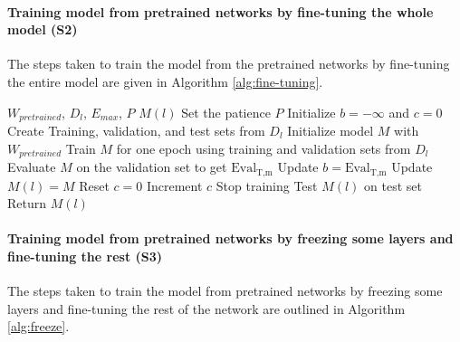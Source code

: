 \documentclass{ieeeaccess}
\begin{document}
\vspace{0.2cm}

\paragraph{Training model from pretrained networks by fine-tuning the whole model (S2)}
The steps taken to train the model from the pretrained networks by fine-tuning the entire model are given in Algorithm \ref{alg:fine-tuning}.

\begin{algorithm}[!ht]
\caption{Training model from pretrained networks by fine-tuning the whole model (S2)}
\label{alg:fine-tuning}
\begin{algorithmic}[1]
\REQUIRE $W_{pretrained}$, $D_{\textit{l}}$, $E_{max}$, $P$
\ENSURE $M(l)$
\STATE Set the patience $P$ 
\STATE Initialize $\textit{b} = -\infty$ and $\textit{c} = 0$
\STATE Create Training, validation, and test sets from $D_{\textit{l}}$
\STATE Initialize model $M$ with  $W_{pretrained}$
    \STATE Train $M$ for one epoch using training and validation sets from $D_{\textit{l}}$
    \STATE Evaluate $M$ on the validation set to get $\text{Eval}_{\text{T},\text{m}}$  
        \STATE Update $b = \text{Eval}_{\text{T},\text{m}}$
        \STATE Update $M(l)=M$
        \STATE Reset $c = 0$
    \ELSE
        \STATE Increment $c$
    \ENDIF
        \STATE Stop training
        \STATE Test $M(l)$ on test set
        \STATE Return $M(l)$
    \ENDIF
\ENDFOR
\end{algorithmic}
\end{algorithm}

\paragraph{Training model from pretrained networks by freezing some layers and fine-tuning the rest (S3)}
The steps taken to train the model from pretrained networks by freezing some layers and fine-tuning the rest of the network are outlined in Algorithm \ref{alg:freeze}.
\end{document}
